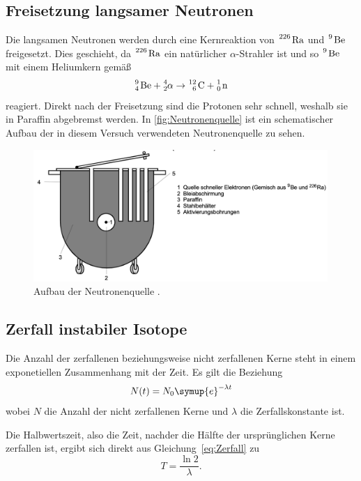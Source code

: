 \subsection{Freisetzung langsamer Neutronen}
\label{sec:Neutronenaktivierung}
Die langsamen Neutronen werden durch eine Kernreaktion von $\ce{^226 Ra}$ und $\ce{^9 Be}$ freigesetzt. Dies geschieht, da
$\ce{^226 Ra}$ ein natürlicher $\alpha$-Strahler ist und so $\ce{^9 Be}$ mit einem Heliumkern gemäß
\begin{equation*}
    \ce{^9_4 Be} + \ce{^4_2 } \alpha \to \ce{^12_6 C} + \ce{^1_0 n}
\end{equation*}
reagiert.
Direkt nach der Freisetzung sind die Protonen sehr schnell, weshalb sie in Paraffin abgebremst werden. In \autoref{fig:Neutronenquelle}
ist ein schematischer Aufbau der in diesem Versuch verwendeten Neutronenquelle zu sehen.
\begin{figure}[H]
    \centering
    \includegraphics[height=5cm]{content/pics/Neutronenquelle.png}
    \caption{Aufbau der Neutronenquelle \cite{v702}.}
    \label{fig:Neutronenquelle}
\end{figure}

\subsection{Zerfall instabiler Isotope}
Die Anzahl der zerfallenen beziehungsweise nicht zerfallenen Kerne steht in einem exponetiellen Zusammenhang mit der Zeit.
Es gilt die Beziehung
\begin{equation}
    N(t)=N_0\symup{e}^{-\lambda t} \label{eq:Zerfall}
\end{equation}
wobei $N$ die Anzahl der nicht zerfallenen Kerne und $\lambda$ die Zerfallskonstante ist.

Die Halbwertszeit, also die Zeit, nachder die Hälfte der ursprünglichen Kerne zerfallen ist, ergibt sich direkt aus
Gleichung~\eqref{eq:Zerfall} zu
\begin{equation}
    T = \frac{\ln 2}{\lambda}. \label{eq:Halbwertszeit}
\end{equation}

